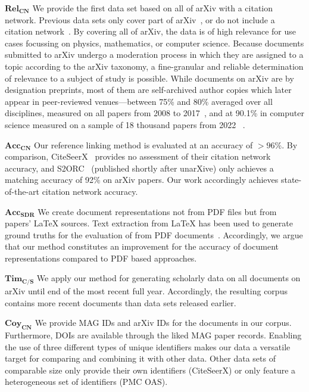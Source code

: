 $\mathbf{Rel_{CN}}$ We provide the first data set based on all of arXiv with a citation network. Previous data sets only cover part of arXiv~\cite{Faerber2018LREC}, or do not include a citation network~\cite{arXMLiv}. By covering all of arXiv, the data is of high relevance for use cases focussing on physics, mathematics, or computer science. %
Because documents submitted to arXiv undergo a moderation process in which they are assigned to a topic according to the arXiv taxonomy, a fine-granular and reliable determination of relevance to a subject of study is possible. While documents on arXiv are by designation preprints, most of them are self-archived author copies which later appear in peer-reviewed venues---between 75\% and 80\% averaged over all disciplines, measured on all papers from 2008 to 2017~\cite{Lin2020}, and at 90.1\% in computer science measured on a sample of 18 thousand papers from 2022~\cite{Bagchi2024} .

$\mathbf{Acc_{CN}}$ Our reference linking method is evaluated at an accuracy of $>96$\%. By comparison, CiteSeerX~\cite{Wu2015,Wu2016,Patel2021} provides no assessment of their citation network accuracy, and S2ORC~\cite{Lo2020} (published shortly after unarXive) only achieves a matching accuracy of 92\% on arXiv papers. Our work accordingly achieves state-of-the-art citation network accuracy.

$\mathbf{Acc_{SDR}}$ We create document representations not from PDF files but from papers' \LaTeX{} sources. Text extraction from \LaTeX{} has been used to generate ground truths for the evaluation of from PDF documents~\cite{Bast2017}. Accordingly, we argue that our method constitutes an improvement for the accuracy of document representations compared to PDF based approaches.

$\mathbf{Tim_{C/S}}$ We apply our method for generating scholarly data on all documents on arXiv until end of the most recent full year. Accordingly, the resulting corpus contains more recent documents than data sets released earlier.

$\mathbf{Coy_{CN}}$ We provide MAG IDs and arXiv IDs for the documents in our corpus. Furthermore, DOIs are available through the liked MAG paper records. Enabling the use of three different types of unique identifiers makes our data a versatile target for comparing and combining it with other data. Other data sets of comparable size only provide their own identifiers (CiteSeerX) or only feature a heterogeneous set of identifiers (PMC OAS).

